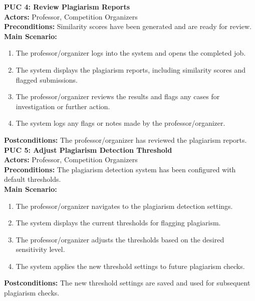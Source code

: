 \documentclass[12pt]{article}
\begin{document}
\textbf{PUC 4: Review Plagiarism Reports}\\
\textbf{Actors:} Professor, Competition Organizers\\
\textbf{Preconditions:} Similarity scores have been generated and are ready for review.\\
\textbf{Main Scenario:}
\begin{enumerate}
    \item The professor/organizer logs into the system and opens the completed job.
    \item The system displays the plagiarism reports, including similarity scores and flagged submissions.
    \item The professor/organizer reviews the results and flags any cases for investigation or further action.
    \item The system logs any flags or notes made by the professor/organizer.
\end{enumerate}
\textbf{Postconditions:} The professor/organizer has reviewed the plagiarism reports.\\[0.2cm]

\textbf{PUC 5: Adjust Plagiarism Detection Threshold}\\
\textbf{Actors:} Professor, Competition Organizers\\
\textbf{Preconditions:} The plagiarism detection system has been configured with default thresholds.\\
\textbf{Main Scenario:}
\begin{enumerate}
    \item The professor/organizer navigates to the plagiarism detection settings.
    \item The system displays the current thresholds for flagging plagiarism.
    \item The professor/organizer adjusts the thresholds based on the desired sensitivity level.
    \item The system applies the new threshold settings to future plagiarism checks.
\end{enumerate}
\textbf{Postconditions:} The new threshold settings are saved and used for subsequent plagiarism checks.\\[0.2cm]
\end{document}
